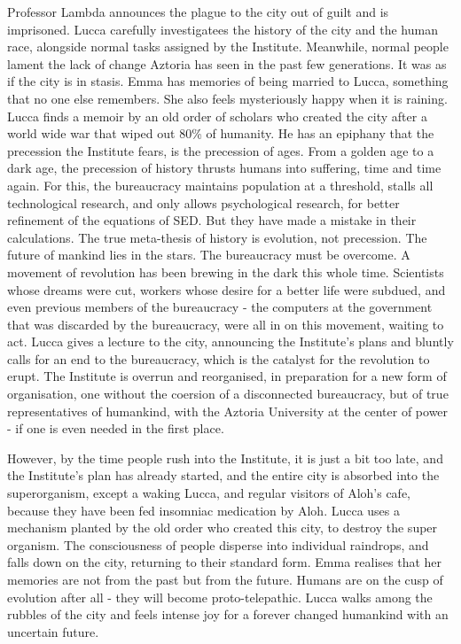 \documentclass[11pt]{article}
\begin{document}
	Professor Lambda announces the plague to the city out of guilt and is imprisoned.	
	Lucca carefully investigatees the history of the city and the human race, alongside normal tasks assigned by the Institute. 
	Meanwhile, normal people lament the lack of change Aztoria has seen in the past few generations.
	It was as if the city is in stasis.
	Emma has memories of being married to Lucca, something that no one else remembers. 
	She also feels mysteriously happy when it is raining.
	Lucca finds a memoir by an old order of scholars who created the city after a world wide war that wiped out 80\% of humanity. 
	He has an epiphany that the precession the Institute fears, is the precession of ages. 
	From a golden age to a dark age, the precession of history thrusts humans into suffering, time and time again.
	For this, the bureaucracy maintains population at a threshold, stalls all technological research, and only allows psychological research, for better refinement of the equations of SED.
	But they have made a mistake in their calculations. 
	The true meta-thesis of history is evolution, not precession. 
	The future of mankind lies in the stars.
	The bureaucracy must be overcome.
	A movement of revolution has been brewing in the dark this whole time.
	Scientists whose dreams were cut, workers whose desire for a better life were subdued, and even previous members of the bureaucracy - the computers at the government that was discarded by the bureaucracy, were all in on this movement, waiting to act.
	Lucca gives a lecture to the city, announcing the Institute's plans and bluntly calls for an end to the bureaucracy, which is the catalyst for the revolution to erupt. 
	The Institute is overrun and reorganised, in preparation for a new form of organisation, one without the coersion of a disconnected bureaucracy, but of true representatives of humankind, with the Aztoria University at the center of power - if one is even needed in the first place.
	
	However, by the time people rush into the Institute, it is just a bit too late, and the Institute's plan has already started, and the entire city is absorbed into the superorganism, except a waking Lucca, and regular visitors of Aloh's cafe, because they have been fed insomniac medication by Aloh.
	Lucca uses a mechanism planted by the old order who created this city, to destroy the super organism.
	The consciousness of people disperse into individual raindrops, and falls down on the city, returning to their standard form.
	Emma realises that her memories are not from the past but from the future.
	Humans are on the cusp of evolution after all - they will become proto-telepathic.
	Lucca walks among the rubbles of the city and feels intense joy for a forever changed humankind with an uncertain future.
\end{document}
